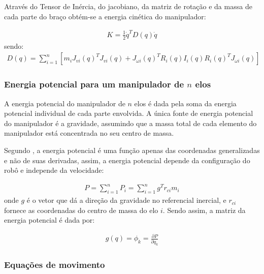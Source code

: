 Através do Tensor de Inércia, do jacobiano, da matriz de rotação e da massa de
cada parte do braço obtém-se a energia cinética do manipulador:

\begin{equation}
  \begin{gathered}
    K=\frac{1}{2}\dot q^T D(q)\dot q
  \end{gathered}
  \label{eq:ecMat}
\end{equation}
sendo:
\begin{equation}
  \begin{gathered}
    D(q)= \sum^n_{i=1}[m_iJ_{vi}(q)^TJ_{vi}(q)+J_{\omega i}(q)^TR_i(q)I_i(q)R_i(q)^TJ_{\omega i}(q)]
  \end{gathered}
  \label{eq:dq}
\end{equation}

\subsubsection{Energia potencial para um manipulador de $n$ elos}

A energia potencial do manipulador de $n$ elos é dada pela soma da energia
potencial individual de cada parte envolvida. A única fonte de energia potencial
do manipulador é a gravidade, assumindo que a massa total de cada elemento 
do manipulador está concentrada no seu centro de massa.

Segundo , a energia potencial é uma função apenas das 
coordenadas generalizadas e não de suas derivadas, assim, a energia 
potencial depende da configuração do robô e independe da velocidade:

\begin{equation}
  \begin{gathered}
    P = \sum^n_{i=1}P_i = \sum^n_{i=1}g^Tr_{ci}m_i
  \end{gathered}
  \label{eq:enePotencial}
\end{equation}
onde $g$ é o vetor que dá a direção da gravidade no referencial inercial, e 
$r_{ci}$ fornece as coordenadas do centro de massa do elo $i$. Sendo assim,
a matriz da energia potencial é dada por:

\begin{equation}
  \begin{gathered}
    g(q)=\phi_k=\frac{\partial P}{\partial q_k}
  \end{gathered}
  \label{eq:enePotencialMat}
\end{equation}

\subsubsection{Equações de movimento}

